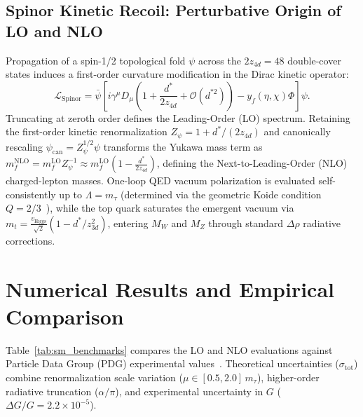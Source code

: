 \documentclass[11pt,a4paper]{article}
\begin{document}
\subsection{Spinor Kinetic Recoil: Perturbative Origin of LO and NLO}
Propagation of a spin-1/2 topological fold $\psi$ across the $2z_{4d} = 48$ double-cover states induces a first-order curvature modification in the Dirac kinetic operator:
\begin{equation}
    \mathcal{L}_{\text{Spinor}} = \bar{\psi} \left[ i\gamma^\mu D_\mu \left( 1 + \frac{d^*}{2z_{4d}} + \mathcal{O}(d^{*2}) \right) - y_f(\eta, \chi)\Phi \right] \psi.
\end{equation}
Truncating at zeroth order defines the Leading-Order (LO) spectrum. Retaining the first-order kinetic renormalization $Z_\psi = 1 + d^*/(2z_{4d})$ and canonically rescaling $\psi_{\text{can}} = Z_\psi^{1/2}\psi$ transforms the Yukawa mass term as $m_f^{\text{NLO}} = m_f^{\text{LO}} Z_\psi^{-1} \approx m_f^{\text{LO}}(1 - \frac{d^*}{2z_{4d}})$, defining the Next-to-Leading-Order (NLO) charged-lepton masses. One-loop QED vacuum polarization is evaluated self-consistently up to $\Lambda = m_\tau$ (determined via the geometric Koide condition $Q = 2/3$~\cite{Koide1982}), while the top quark saturates the emergent vacuum via $m_t = \frac{v_{\text{Higgs}}}{\sqrt{2}}(1 - d^*/z_{3d}^2)$, entering $M_W$ and $M_Z$ through standard $\Delta\rho$ radiative corrections.

\section{Numerical Results and Empirical Comparison}

Table~\ref{tab:sm_benchmarks} compares the LO and NLO evaluations against Particle Data Group (PDG) experimental values~\cite{PDG2024}. Theoretical uncertainties ($\sigma_{\text{tot}}$) combine renormalization scale variation ($\mu \in [0.5, 2.0]\,m_\tau$), higher-order radiative truncation ($\alpha/\pi$), and experimental uncertainty in $G$ ($\Delta G/G = 2.2 \times 10^{-5}$).
\end{document}
